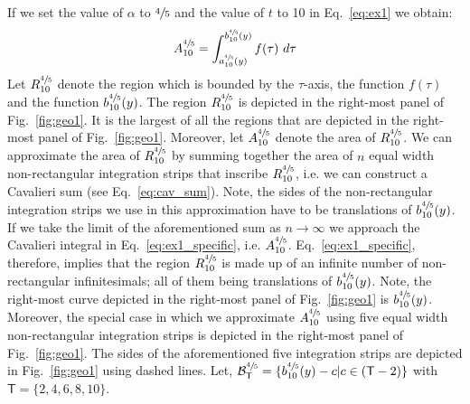 \documentclass{article}
\theoremstyle{theorem}
\theoremstyle{definition}
\begin{document}
\noindent
If we set the value of $\alpha$ to $\sfrac{4}{5}$ and the value of $t$ to 10 in Eq.~\eqref{eq:ex1} we obtain:
\begin{equation}
\label{eq:ex1_specific}
A_{10}^{\sfrac{4}{5}}=\int_{a_{10}^{\sfrac{4}{5}}(y)}^{b_{10}^{\sfrac{4}{5}}(y)} f(\tau)~d\tau 
\end{equation}
Let $R_{10}^{\sfrac{4}{5}}$ denote the region which is bounded by the $\tau$-axis, the function $f(\tau)$ and the function $b_{10}^{\sfrac{4}{5}}(y)$. The region $R_{10}^{\sfrac{4}{5}}$ is depicted in the right-most panel of Fig.~\ref{fig:geo1}. It is the largest of all the 
regions that are depicted in the right-most panel of Fig.~\ref{fig:geo1}. Moreover, let $A_{10}^{\sfrac{4}{5}}$ denote the area of $R_{10}^{\sfrac{4}{5}}$. 
We can approximate the area of $R_{10}^{\sfrac{4}{5}}$ by summing together the area of $n$ equal width non-rectangular integration strips that inscribe $R_{10}^{\sfrac{4}{5}}$, i.e. we can 
construct a Cavalieri sum (see Eq.~\eqref{eq:cav_sum}). Note, the sides of the non-rectangular integration strips we use in this approximation have to be translations of $b_{10}^{\sfrac{4}{5}}(y)$.
If we take the limit of the aforementioned sum as $n\rightarrow \infty$ we approach the Cavalieri integral in Eq.~\eqref{eq:ex1_specific}, i.e. $A_{10}^{\sfrac{4}{5}}$.  
Eq.~\eqref{eq:ex1_specific}, therefore, implies that the region $R_{10}^{\sfrac{4}{5}}$ is made up 
of an infinite number of non-rectangular infinitesimals; all of them being translations of $b_{10}^{\sfrac{4}{5}}(y)$. Note, the right-most curve depicted in the right-most panel of Fig.~\ref{fig:geo1} is $b_{10}^{\sfrac{4}{5}}(y)$.  Moreover, the special case in which we approximate $A_{10}^{\sfrac{4}{5}}$ using five equal width non-rectangular integration strips is depicted in the right-most panel of Fig.~\ref{fig:geo1}. 
The sides of the aforementioned five integration strips are depicted in Fig.~\ref{fig:geo1} using dashed lines. Let, $\mathcal{B}_{\mathsf{T}}^{\sfrac{4}{5}}=\{b_{10}^{\sfrac{4}{5}}(y)-c|c\in(\mathsf{T}-2)\}$ with $\mathsf{T}=\{2,4,6,8,10\}$.\\ 

\end{document}
